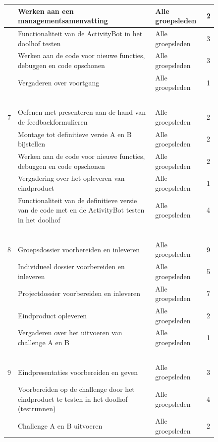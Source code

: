 \documentclass[oneside]{book}
\begin{document}
{\begin{figure}[H]
\begin{adjustwidth}{-3.5cm}{}
\begin{tabular}{ | l | l | l | l | }
	 & Werken aan een managementsamenvatting & Alle groepsleden & 2 \\ \hline
	 & Functionaliteit van de ActivityBot in het doolhof testen & Alle groepsleden & 3 \\ \hline
	 & Werken aan de code voor nieuwe functies, debuggen en code opschonen & Alle groepsleden & 3 \\ \hline
	 & Vergaderen over voortgang  & Alle groepsleden & 1 \\ \hline
	 & \  & \  & \  \\ \hline
	7 & Oefenen met presenteren aan de hand van de feedbackformulieren & Alle groepsleden & 2 \\ \hline
	 & Montage tot definitieve versie A en B bijstellen & Alle groepsleden & 2 \\ \hline
	 & Werken aan de code voor nieuwe functies, debuggen en code opschonen & Alle groepsleden & 2 \\ \hline
	 & Vergadering over het opleveren van eindproduct  & Alle groepsleden & 1 \\ \hline
	 & Functionaliteit van de definitieve versie van de code met en de ActivityBot testen in het doolhof & Alle groepsleden & 4 \\ \hline
	 & \  & \  & \  \\ \hline
	8 & Groepsdossier voorbereiden en  inleveren & Alle groepsleden & 9 \\ \hline
	 & Individueel dossier voorbereiden en inleveren & Alle groepsleden & 5 \\ \hline
	 & Projectdossier voorbereiden en inleveren & Alle groepsleden & 7 \\ \hline
	 & Eindproduct opleveren & Alle groepsleden & 2 \\ \hline
	 & Vergaderen over het uitvoeren van challenge A en B & Alle groepsleden & 1 \\ \hline
	 & \  & \  & \  \\ \hline
	9 & Eindpresentaties voorbereiden en geven & Alle groepsleden & 3 \\ \hline
	 & Voorbereiden op de challenge door het eindproduct te testen in het doolhof (testrunnen) & Alle groepsleden & 4 \\ \hline
	 & Challenge A en B uitvoeren & Alle groepsleden & 2 \\ \hline
\end{tabular}
\end{adjustwidth}\end{figure}
}
\end{document}

